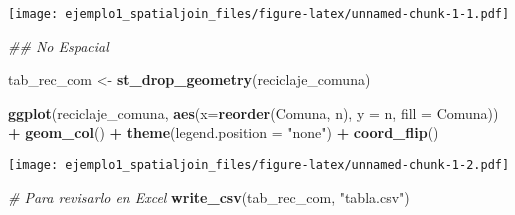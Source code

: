\documentclass[]{article}
\newenvironment{Shaded}{\begin{snugshade}}{\end{snugshade}}
\newcommand{\CommentTok}[1]{\textcolor[rgb]{0.56,0.35,0.01}{\textit{#1}}}
\newcommand{\DataTypeTok}[1]{\textcolor[rgb]{0.13,0.29,0.53}{#1}}
\newcommand{\DecValTok}[1]{\textcolor[rgb]{0.00,0.00,0.81}{#1}}
\newcommand{\KeywordTok}[1]{\textcolor[rgb]{0.13,0.29,0.53}{\textbf{#1}}}
\newcommand{\NormalTok}[1]{#1}
\newcommand{\OperatorTok}[1]{\textcolor[rgb]{0.81,0.36,0.00}{\textbf{#1}}}
\newcommand{\StringTok}[1]{\textcolor[rgb]{0.31,0.60,0.02}{#1}}
\begin{document}
\begin{Shaded}
\end{Shaded}

\texttt{[image: ejemplo1\_spatialjoin\_files/figure-latex/unnamed-chunk-1-1.pdf]}

\begin{Shaded}
\begin{Highlighting}[]
\CommentTok{## No Espacial}

\NormalTok{tab_rec_com <-}\StringTok{ }\KeywordTok{st_drop_geometry}\NormalTok{(reciclaje_comuna)}

\KeywordTok{ggplot}\NormalTok{(reciclaje_comuna, }\KeywordTok{aes}\NormalTok{(}\DataTypeTok{x=}\KeywordTok{reorder}\NormalTok{(Comuna, n), }\DataTypeTok{y =}\NormalTok{ n, }\DataTypeTok{fill =}\NormalTok{ Comuna)) }\OperatorTok{+}
\StringTok{  }\KeywordTok{geom_col}\NormalTok{() }\OperatorTok{+}
\StringTok{  }\KeywordTok{theme}\NormalTok{(}\DataTypeTok{legend.position =} \StringTok{"none"}\NormalTok{) }\OperatorTok{+}
\StringTok{  }\KeywordTok{coord_flip}\NormalTok{()}
\end{Highlighting}
\end{Shaded}

\texttt{[image: ejemplo1\_spatialjoin\_files/figure-latex/unnamed-chunk-1-2.pdf]}

\begin{Shaded}
\begin{Highlighting}[]
\CommentTok{# Para revisarlo en Excel}
\KeywordTok{write_csv}\NormalTok{(tab_rec_com, }\StringTok{"tabla.csv"}\NormalTok{)}
\end{Highlighting}
\end{Shaded}
\end{document}
